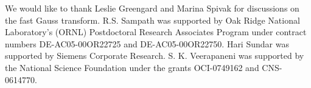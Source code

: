 We would like to thank Leslie Greengard and Marina Spivak for discussions on the fast Gauss transform. 
R.S. Sampath was supported by Oak Ridge National Laboratory's (ORNL) Postdoctoral Research Associates Program under contract numbers DE-AC05-00OR22725 and DE-AC05-00OR22750. Hari Sundar was supported by Siemens Corporate Research. S. K. Veerapaneni was supported by the National Science Foundation under the grants OCI-0749162 and CNS-0614770.
